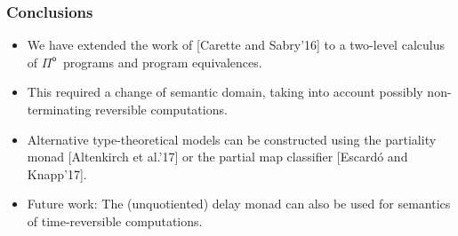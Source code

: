 \documentclass[12pt,t]{beamer}
\newcommand{\Pio}{\ensuremath{\mathsf{\Pi}^{\mathsf{o}}}}
\begin{document}
\begin{frame}
  \frametitle{Conclusions}
  \begin{itemize}
  \item We have extended the work of [Carette and Sabry'16] to a
    two-level calculus of \Pio\ programs and program equivalences.
    \item This required a change of semantic domain, taking into
      account possibly non-terminating reversible computations.
    \item Alternative type-theoretical models can be constructed using
      the partiality monad [Altenkirch et al.'17] or the partial map
      classifier [Escardó and Knapp'17].
    \item Future work: The (unquotiented) delay monad can also be used for
      semantics of time-reversible computations.
      
      
  \end{itemize}
\end{frame}

\end{document}

